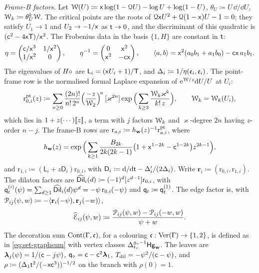 \emph{Frame-B factors.} Let $\mathcal{W}(U)\coloneqq\mathsf{x}\log(1-\mathcal{Q} U)-\log U+\log(1-U)$, $\theta_U\coloneqq U\,\dd/\dd U$, $\mathcal{W}_k\coloneqq\theta_U^k\mathcal{W}$. The critical points are the roots of $\mathcal{Q}\mathsf{x} U^2+\mathcal{Q}(1-\mathsf{x})U-1=0$; they satisfy $U_1\to 1$ and $U_2\to-1/\mathsf{x}$ as $\mathsf{t}\to 0$, and the discriminant of this quadratic is $(\mathsf{c}^2-4\mathsf{x}\mathsf{T})/\mathsf{x}^2$. The Frobenius data in the basis $\{1,H\}$ are constant in $\mathsf{t}$:
\[
\eta=\begin{pmatrix}\mathsf{c}/\mathsf{x}^3&1/\mathsf{x}^2\\1/\mathsf{x}^2&0\end{pmatrix},\qquad
\eta^{-1}=\begin{pmatrix}0&\mathsf{x}^2\\\mathsf{x}^2&-\mathsf{c}\mathsf{x}\end{pmatrix},\qquad
\langle a,b\rangle=\mathsf{x}^2(a_0b_1+a_1b_0)-\mathsf{c}\mathsf{x}\,a_1b_1.
\]
The eigenvalues of $H\circ$ are $\mathsf{L}_i=(\mathsf{x} U_i+1)/\mathsf{T}$, and $\Delta_i\coloneqq1/\eta(\mathfrak{e}_i,\mathfrak{e}_i)$. The point-frame row is the normalised formal Laplace expansion of $\mathrm{e}^{\mathcal{W}/z}\mathrm{d} U/U$ at $U_i$:
\[
\mathrm{r}^{\mathrm{pt}}_{0,i}(z)\coloneqq\sum_{n\geq 0}\frac{(2n)!}{n!\,2^n}\Big(\frac{-z}{\mathcal{W}_2}\Big)^{\!n}\,[\varkappa^{2n}]\exp\Big(\sum_{k\geq 3}\frac{\mathcal{W}_k\varkappa^k}{k!\,z}\Big),\qquad\mathcal{W}_k=\mathcal{W}_k(U_i),
\]
which lies in $1+z(\cdots)[\![ z ]\!]$, a term with $j$ factors $\mathcal{W}_k$ and $\varkappa$-degree $2n$ having $z$-order $n-j$. The frame-B rows are $\mathrm{r}_{a,i}\coloneqq h_{\mathbf{w}}(z)^{-1}\mathrm{r}^{\mathrm{pt}}_{a,i}$, where
\[
h_{\mathbf{w}}(z)=\exp\Big(\sum_{k\geq 1}\frac{B_{2k}}{2k(2k-1)}\big(1+\mathsf{x}^{1-2k}-\mathsf{c}^{1-2k}\big)z^{2k-1}\Big),
\]
and $\mathrm{r}_{1,i}\coloneqq(\mathsf{L}_i+z\mathsf{D}_i)\mathrm{r}_{0,i}$, with $\mathsf{D}_i\coloneqq\mathrm{d}/\mathrm{d}\mathsf{t}-\Delta_i'/(2\Delta_i)$. Write $\mathbf{r}_i\coloneqq(\mathrm{r}_{0,i},\mathrm{r}_{1,i})$. The dilaton factors are $\widehat{\mathsf{Dil}}_i(d)\coloneqq(-1)^d[z^{d-1}]\mathrm{r}_{0,i}$, with $\mathsf{q}_{t}^{(i)}(\psi)=\sum_{d\geq 1}\widehat{\mathsf{Dil}}_i(d)\psi^d=-\psi\,\mathrm{r}_{0,i}(-\psi)$ and $\mathsf{q}_{t}\coloneqq\mathsf{q}_{t}^{(1)}$. The edge factor is, with $\mathcal{P}_{ij}(\psi,w)\coloneqq-\langle\mathbf{r}_i(-\psi),\mathbf{r}_j(-w)\rangle$,
\[
\widehat{\mathcal{E}}_{ij}(\psi,w)\coloneqq\frac{\mathcal{P}_{ij}(\psi,w)-\mathcal{P}_{ij}(-w,w)}{\psi+w}.
\]
The decoration sum $\mathrm{Cont}(\Gamma,\mathfrak{c})$, for a colouring $\mathfrak{c}:\mathrm{Ver}(\Gamma)\to\{1,2\}$, is defined as in \cref{eq:set-graphsum} with vertex classes $\Delta_{\mathfrak{c}_{v}}^{g_{v}-1}\mathsf{Hg}_{\mathbf{w}}$. The leaves are $\boldsymbol{\lambda}_j(\psi)=1/(\mathsf{c}-j\psi)$, $\mathsf{q}_{\circ}=\mathsf{c}-\mathsf{c}^2\boldsymbol{\lambda}_1$, $T_{\mathrm{dil}}=-\psi^2/(\mathsf{c}-\psi)$, and $\rho\coloneqq(\Delta_1\mathsf{t}^2/(-\mathsf{x}\mathsf{c}^3))^{-1/2}$ on the branch with $\rho(0)=1$.

